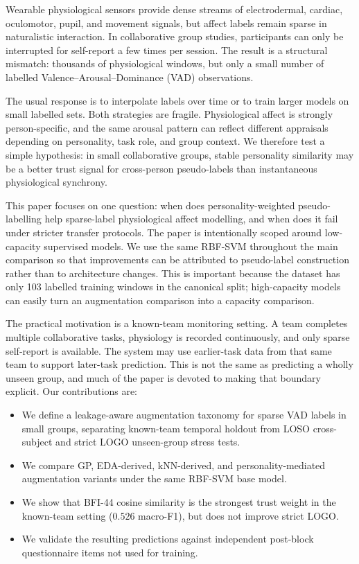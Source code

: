 \documentclass[sigconf,review,anonymous]{acmart}
\begin{document}
Wearable physiological sensors provide dense streams of electrodermal,
cardiac, oculomotor, pupil, and movement signals, but affect labels remain
sparse in naturalistic interaction.
In collaborative group studies, participants can only be interrupted for
self-report a few times per session.
The result is a structural mismatch: thousands of physiological windows, but
only a small number of labelled Valence--Arousal--Dominance (VAD) observations.

The usual response is to interpolate labels over time or to train larger
models on small labelled sets.
Both strategies are fragile.
Physiological affect is strongly person-specific, and the same arousal pattern
can reflect different appraisals depending on personality, task role, and group
context.
We therefore test a simple hypothesis: in small collaborative groups, stable
personality similarity may be a better trust signal for cross-person
pseudo-labels than instantaneous physiological synchrony.

This paper focuses on one question: when does personality-weighted
pseudo-labelling help sparse-label physiological affect modelling, and when
does it fail under stricter transfer protocols.
The paper is intentionally scoped around low-capacity supervised models.
We use the same RBF-SVM throughout the main comparison so that improvements can
be attributed to pseudo-label construction rather than to architecture changes.
This is important because the dataset has only 103 labelled training windows in
the canonical split; high-capacity models can easily turn an augmentation
comparison into a capacity comparison.

The practical motivation is a known-team monitoring setting.
A team completes multiple collaborative tasks, physiology is recorded
continuously, and only sparse self-report is available.
The system may use earlier-task data from that same team to support later-task
prediction.
This is not the same as predicting a wholly unseen group, and much of the
paper is devoted to making that boundary explicit.
Our contributions are:

\begin{itemize}[leftmargin=1.2em,itemsep=1pt,topsep=2pt]
  \item We define a leakage-aware augmentation taxonomy for sparse VAD labels
  in small groups, separating known-team temporal holdout from LOSO
  cross-subject and strict LOGO unseen-group stress tests.
  \item We compare GP, EDA-derived, kNN-derived, and personality-mediated
  augmentation variants under the same RBF-SVM base model.
  \item We show that BFI-44 cosine similarity is the strongest trust weight in
  the known-team setting ($0.526$ macro-F1), but does not improve strict LOGO.
  \item We validate the resulting predictions against independent post-block
  questionnaire items not used for training.
\end{itemize}
\end{document}
